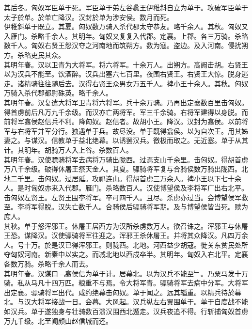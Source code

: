 \documentclass{zhvt-classic}
\begin{document}
\hspace*{2em}其后冬。匈奴军臣单于死。军臣单于弟左谷蠡王伊稚斜自立为单于。攻破军臣单于太子於单。於单亡降汉。汉封於单为涉安侯。数月而死。\\
\hspace*{2em}伊稚斜单于既立。其夏。匈奴数万骑入杀代郡太守恭友。略千余人。其秋。匈奴又入雁门。杀略千余人。其明年。匈奴又复复入代郡。定襄。上郡。各三万骑。杀略数千人。匈奴右贤王怨汉夺之河南地而筑朔方。数为寇。盗边。及入河南。侵扰朔方。杀略吏民其众。\\
\hspace*{2em}其明年春。汉以卫青为大将军。将六将军。十余万人。出朔方。高阙击胡。右贤王以为汉兵不能至。饮酒醉。汉兵出塞六七百里。夜围右贤王。右贤王大惊。脱身逃走。诸精骑往往随后去。汉得右贤王众男女万五千人。裨小王十余人。其秋。匈奴万骑入杀代郡都尉硃英。略千余人。\\
\hspace*{2em}其明年春。汉复遣大将军卫青将六将军。兵十余万骑。乃再出定襄数百里击匈奴。得首虏前后凡万九千余级。而汉亦亡两将军。军三千余骑。右将军建得以身脱。而前将军翕侯赵信兵不利。降匈奴。赵信者。故胡小王。降汉。汉封为翕侯。以前将军与右将军并军分行。独遇单于兵。故尽没。单于既得翕侯。以为自次王。用其姊妻之。与谋汉。信教单于益北绝幕。以诱罢汉兵。徼极而取之。无近塞。单于从其计。其明年。胡骑万人入上谷。杀数百人。\\
\hspace*{2em}其明年春。汉使骠骑将军去病将万骑出陇西。过焉支山千余里。击匈奴。得胡首虏万八千余级。破得休屠王祭天金人。其夏。骠骑将军复与合骑侯数万骑出陇西。北地二千里。击匈奴。过居延。攻祁连山。得胡首虏三万余人。裨小王以下七十余人。是时匈奴亦来入代郡。雁门。杀略数百人。汉使博望侯及李将军广出右北平。击匈奴左贤王。左贤王围李将军。卒可四千人。且尽。杀虏亦过当。会博望侯军救至。李将军得脱。汉失亡数千人。合骑侯后骠骑将军期。及与博望侯皆当死。赎为庶人。\\
\hspace*{2em}其秋。单于怒浑邪王。休屠王居西方为汉所杀虏数万人。欲召诛之。浑邪王与休屠王恐。谋降汉。汉使骠骑将军往迎之。浑邪王杀休屠王。并将其众降汉。凡四万余人。号十万。於是汉已得浑邪王。则陇西。北地。河西益少胡寇。徙关东贫民处所夺匈奴河南。新秦中以实之。而减北地以西戍卒半。其明年。匈奴入右北平。定襄各数万骑。杀略千余人而去。\\
\hspace*{2em}其明年春。汉谋曰﹁翕侯信为单于计。居幕北。以为汉兵不能至﹂。乃粟马发十万骑。私从马凡十四万匹。粮重不与焉。令大将军青。骠骑将军去病中分军。大将军出定襄。骠骑将军出代。咸约绝幕击匈奴。单于闻之。远其辎重。以精兵待於幕北。与汉大将军接战一日。会暮。大风起。汉兵纵左右翼围单于。单于自度战不能如汉兵。单于遂独身与壮骑数百溃汉围西北遁走。汉兵夜追不得。行斩捕匈奴首虏万九千级。北至阗颜山赵信城而还。\\
\end{document}
